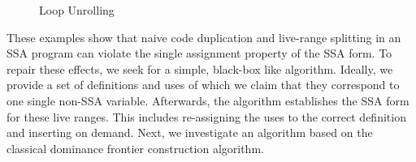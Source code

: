 \begin{figure}[htbp]
	\begin{center}
		\hfill
		\hfill
	\end{center}
	\caption{Loop Unrolling}
	\label{fig:unroll}
\end{figure}

These examples show that naive code duplication and live-range splitting in an SSA program can violate the single assignment property of the SSA form.
To repair these effects, we seek for a simple, black-box like algorithm.
Ideally, we provide a set of definitions and uses of which we claim that they correspond to one single non-SSA variable.
Afterwards, the algorithm establishes the SSA form for these live ranges.
This includes re-assigning the uses to the correct definition and inserting \phifuns on demand.
Next, we investigate an algorithm based on the classical dominance frontier construction algorithm.

